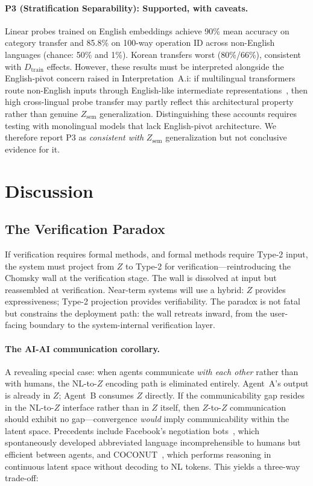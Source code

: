 \documentclass[11pt]{article}
\theoremstyle{definition}
\newcommand{\Zsem}{Z_{\text{sem}}}
\newcommand{\Dtrain}{D_{\text{train}}}
\begin{document}
\paragraph{P3 (Stratification Separability): Supported, with caveats.}
Linear probes trained on English embeddings achieve 90\% mean accuracy on category transfer and 85.8\% on 100-way operation ID across non-English languages (chance: 50\% and 1\%). Korean transfers worst (80\%/66\%), consistent with $\Dtrain$ effects. However, these results must be interpreted alongside the English-pivot concern raised in Interpretation~A.i: if multilingual transformers route non-English inputs through English-like intermediate representations~\cite{wendler2024llamas}, then high cross-lingual probe transfer may partly reflect this architectural property rather than genuine $\Zsem$ generalization. Distinguishing these accounts requires testing with monolingual models that lack English-pivot architecture. We therefore report P3 as \emph{consistent with} $\Zsem$ generalization but not conclusive evidence for it.


\section{Discussion}

\subsection{The Verification Paradox}\label{sec:verification}

If verification requires formal methods, and formal methods require Type-2 input, the system must project from $Z$ to Type-2 for verification---reintroducing the Chomsky wall at the verification stage. The wall is dissolved at input but reassembled at verification. Near-term systems will use a hybrid: $Z$ provides expressiveness; Type-2 projection provides verifiability. The paradox is not fatal but constrains the deployment path: the wall retreats inward, from the user-facing boundary to the system-internal verification layer.

\paragraph{The AI-AI communication corollary.}
A revealing special case: when agents communicate \emph{with each other} rather than with humans, the NL-to-$Z$ encoding path is eliminated entirely. Agent~A's output is already in $Z$; Agent~B consumes $Z$ directly. If the communicability gap resides in the NL-to-$Z$ interface rather than in $Z$ itself, then $Z$-to-$Z$ communication should exhibit no gap---convergence \emph{would} imply communicability within the latent space. Precedents include Facebook's negotiation bots~\cite{lewis2017negotiation}, which spontaneously developed abbreviated language incomprehensible to humans but efficient between agents, and COCONUT~\cite{hao2024coconut}, which performs reasoning in continuous latent space without decoding to NL tokens. This yields a three-way trade-off:
\end{document}
